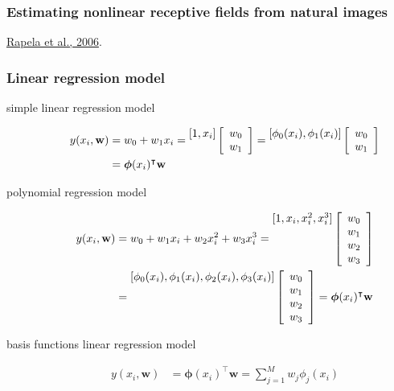 \documentclass[11pt]{beamer}
\begin{document}
\begin{frame}
    \frametitle{Estimating nonlinear receptive fields from natural images}

    \href{https://jov.arvojournals.org/article.aspx?articleid=2192869}{Rapela et al., 2006}.

\end{frame}

\begin{frame}
    \frametitle{Linear regression model}

	\scriptsize
	\begin{description}
		\item[simple linear regression model]
			\begin{align*}
                y(x_i, \mathbf{w})&=w_0+w_1x_i
				                   =\raisebox{0.60em}{$[1,x_i]$}
									\left[\begin{array}{c}
								        w_0\\
								        w_1
								    \end{array}\right]
				                   =\raisebox{0.60em}{$[\phi_0(x_i),\phi_1(x_i)]$}
									\left[\begin{array}{c}
								        w_0\\
								        w_1
								    \end{array}\right]\\
                                  & =
									\boldsymbol{\phi}(x_i)^\intercal\mathbf{w}
			\end{align*}
		\item[polynomial regression model]
			\begin{align*}
				y(x_i, \mathbf{w})&=w_0+w_1x_i+w_2x_i^2+w_3x_i^3
				                   =\raisebox{1.80em}{$[1,x_i,x_i^2,x_i^3]$}
									\left[\begin{array}{c}
								        w_0\\
								        w_1\\
								        w_2\\
								        w_3
								    \end{array}\right]\\
				                  &=\raisebox{1.80em}{$[\phi_0(x_i),\phi_1(x_i),\phi_2(x_i),\phi_3(x_i)]$}
									\left[\begin{array}{c}
								        w_0\\
								        w_1\\
								        w_2\\
								        w_3
								    \end{array}\right]=
									\boldsymbol{\phi}(x_i)^\intercal\mathbf{w}
			\end{align*}
		\item[basis functions linear regression model]
			\begin{align*}
				y(x_i, \mathbf{w})&=\boldsymbol{\phi}(x_i)^\intercal\mathbf{w}=\sum_{j=1}^Mw_j\phi_j(x_i)
			\end{align*}
	\end{description}
	\normalsize
\end{frame}
\end{document}
